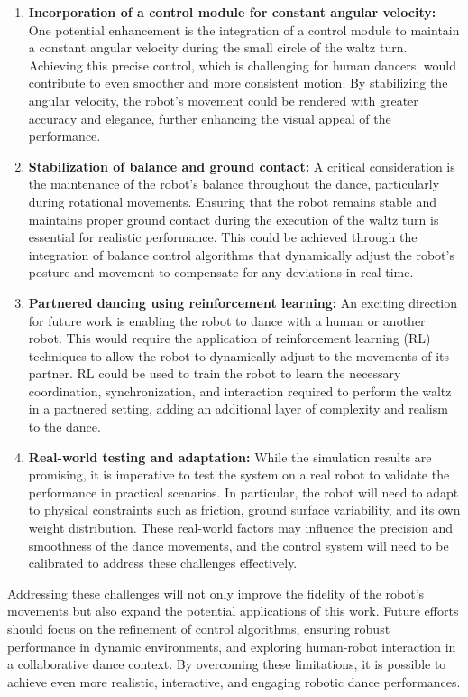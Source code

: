 \documentclass{amsart}
\theoremstyle{definition}
\theoremstyle{plain}
\begin{document}
\begin{enumerate} 
  \item \textbf{Incorporation of a control module for constant angular velocity:} One potential enhancement is the integration of a control module to maintain a constant angular velocity during the small circle of the waltz turn. 
  Achieving this precise control, which is challenging for human dancers, would contribute to even smoother and more consistent motion. 
  By stabilizing the angular velocity, the robot’s movement could be rendered with greater accuracy and elegance, further enhancing the visual appeal of the performance.
  \item \textbf{Stabilization of balance and ground contact:} A critical consideration is the maintenance of the robot’s balance throughout the dance, particularly during rotational movements. 
  Ensuring that the robot remains stable and maintains proper ground contact during the execution of the waltz turn is essential for realistic performance. 
  This could be achieved through the integration of balance control algorithms that dynamically adjust the robot's posture and movement to compensate for any deviations in real-time.

  \item \textbf{Partnered dancing using reinforcement learning:} An exciting direction for future work is enabling the robot to dance with a human or another robot. 
  This would require the application of reinforcement learning (RL) techniques to allow the robot to dynamically adjust to the movements of its partner. 
  RL could be used to train the robot to learn the necessary coordination, synchronization, and interaction required to perform the waltz in a partnered setting, adding an additional layer of complexity and realism to the dance.
  
  \item \textbf{Real-world testing and adaptation:} While the simulation results are promising, it is imperative to test the system on a real robot to validate the performance in practical scenarios. 
  In particular, the robot will need to adapt to physical constraints such as friction, ground surface variability, and its own weight distribution. 
  These real-world factors may influence the precision and smoothness of the dance movements, and the control system will need to be calibrated to address these challenges effectively.
\end{enumerate}

  Addressing these challenges will not only improve the fidelity of the robot’s movements but also expand the potential applications of this work. 
  Future efforts should focus on the refinement of control algorithms, ensuring robust performance in dynamic environments, and exploring human-robot interaction in a collaborative dance context. 
  By overcoming these limitations, it is possible to achieve even more realistic, interactive, and engaging robotic dance performances.
\end{document}
